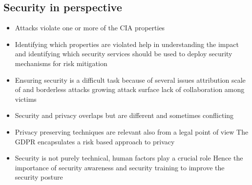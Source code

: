 \documentclass[12pt, a4paper]{article}
\begin{document}
\subsection{Security in perspective}
\begin{itemize}
    \item Attacks violate one or more of the CIA properties
    \item Identifying which properties are violated help in
    \subitem understanding the impact and
    \subitem identifying which security services should be used to deploy security mechanisms for risk mitigation
    \item Ensuring security is a difficult task because of several issues
    \subitem attribution
    \subitem scale of and borderless attacks
    \subitem growing attack surface
    \subitem lack of collaboration among victims
    \item Security and privacy overlaps but are different and sometimes conflicting
    \item Privacy preserving techniques are relevant also from a legal point of view
    \subitem The GDPR encapsulates a risk based approach to privacy
    \item Security is not purely technical, human factors play a crucial role
    \subitem Hence the importance of security awareness and security training to improve the security posture
\end{itemize}
\end{document}
